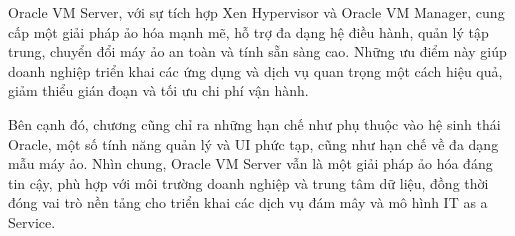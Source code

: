 Oracle VM Server, với sự tích hợp Xen Hypervisor và Oracle VM Manager, cung cấp một giải pháp ảo hóa mạnh mẽ, hỗ trợ đa dạng hệ điều hành, quản lý tập trung, chuyển đổi máy ảo an toàn và tính sẵn sàng cao. Những ưu điểm này giúp doanh nghiệp triển khai các ứng dụng và dịch vụ quan trọng một cách hiệu quả, giảm thiểu gián đoạn và tối ưu chi phí vận hành.

Bên cạnh đó, chương cũng chỉ ra những hạn chế như phụ thuộc vào hệ sinh thái Oracle, một số tính năng quản lý và UI phức tạp, cũng như hạn chế về đa dạng mẫu máy ảo. Nhìn chung, Oracle VM Server vẫn là một giải pháp ảo hóa đáng tin cậy, phù hợp với môi trường doanh nghiệp và trung tâm dữ liệu, đồng thời đóng vai trò nền tảng cho triển khai các dịch vụ đám mây và mô hình IT as a Service.
